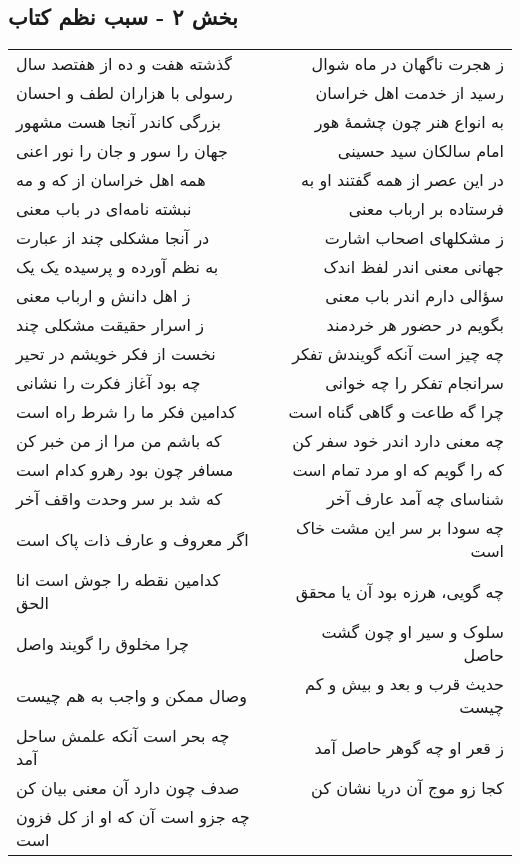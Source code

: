 \begin{center}
\section*{بخش ۲ - سبب نظم کتاب}
\label{sec:sh002}
\begin{longtable}{l p{0.5cm} r}
گذشته هفت و ده از هفتصد سال
&&
ز هجرت ناگهان در ماه شوال
\\
رسولی با هزاران لطف و احسان
&&
رسید از خدمت اهل خراسان
\\
بزرگی کاندر آنجا هست مشهور
&&
به انواع هنر چون چشمهٔ هور
\\
جهان را سور و جان را نور اعنی
&&
امام سالکان سید حسینی
\\
همه اهل خراسان از که و مه
&&
در این عصر از همه گفتند او به
\\
نبشته نامه‌ای در باب معنی
&&
فرستاده بر ارباب معنی
\\
در آنجا مشکلی چند از عبارت
&&
ز مشکلهای اصحاب اشارت
\\
به نظم آورده و پرسیده یک یک
&&
جهانی معنی اندر لفظ اندک
\\
ز اهل دانش و ارباب معنی
&&
سؤالی دارم اندر باب معنی
\\
ز اسرار حقیقت مشکلی چند
&&
بگویم در حضور هر خردمند
\\
نخست از فکر خویشم در تحیر
&&
چه چیز است آنکه گویندش تفکر
\\
چه بود آغاز فکرت را نشانی
&&
سرانجام تفکر را چه خوانی
\\
کدامین فکر ما را شرط راه است
&&
چرا گه طاعت و گاهی گناه است
\\
که باشم من مرا از من خبر کن
&&
چه معنی دارد اندر خود سفر کن
\\
مسافر چون بود رهرو کدام است
&&
که را گویم که او مرد تمام است
\\
که شد بر سر وحدت واقف آخر
&&
شناسای چه آمد عارف آخر
\\
اگر معروف و عارف ذات پاک است
&&
چه سودا بر سر این مشت خاک است
\\
کدامین نقطه را جوش است انا الحق
&&
چه گویی، هرزه بود آن یا محقق
\\
چرا مخلوق را گویند واصل
&&
سلوک و سیر او چون گشت حاصل
\\
وصال ممکن و واجب به هم چیست
&&
حدیث قرب و بعد و بیش و کم چیست
\\
چه بحر است آنکه علمش ساحل آمد
&&
ز قعر او چه گوهر حاصل آمد
\\
صدف چون دارد آن معنی بیان کن
&&
کجا زو موج آن دریا نشان کن
\\
چه جزو است آن که او از کل فزون است

\end{longtable}
\end{center}
